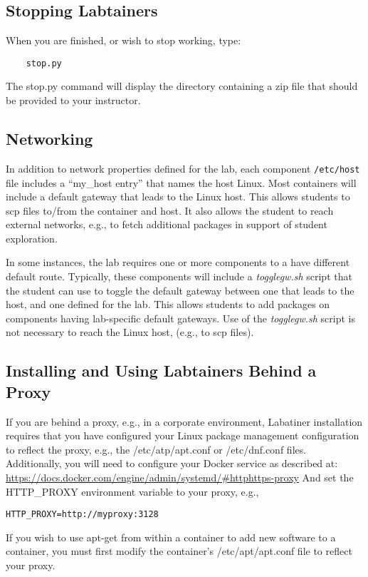 \documentclass[12pt]{article}
\begin{document}
\subsection{Stopping Labtainers}
When you are finished, or wish to stop working, type:
\begin{verbatim}
    stop.py 
\end{verbatim}
\noindent The stop.py command will display the directory containing a zip file that should be provided to your instructor.
\subsection{Networking}
In addition to network properties defined for the lab,
each component \texttt{/etc/host} file includes a ``my\_host entry'' that names
the host Linux.  Most containers will include a default gateway that
leads to the Linux host.  This allows students to scp files to/from the container and host.
It also allows the student to reach external networks, e.g., to fetch additional packages in
support of student exploration.

In some instances, the lab requires one or more components to a have different default route.
Typically, these components will include a \textit{togglegw.sh} script that the student
can use to toggle the default gateway between one that leads to the host, and one defined for the lab.
This allows students to add packages on components having lab-specific default gateways.
Use of the \textit{togglegw.sh} script is not necessary to reach the Linux host, (e.g., to scp files).

\subsection{Installing and Using Labtainers Behind a Proxy}
If you are behind a proxy, e.g., in a corporate environment, Labatiner installation
requires that you have configured your Linux package management configuration to reflect
the proxy, e.g., the /etc/atp/apt.conf or /etc/dnf.conf files.  Additionally,
you will need to configure your Docker service as described at:
\url{https://docs.docker.com/engine/admin/systemd/#httphttps-proxy}
And set the HTTP\_PROXY environment variable to your proxy, e.g., 
\begin{verbatim}
HTTP_PROXY=http://myproxy:3128
\end{verbatim}
If you wish to use apt-get from within a container to add new software to a container, you
must first modify the container's /etc/apt/apt.conf file to reflect your proxy.
\end{document}

